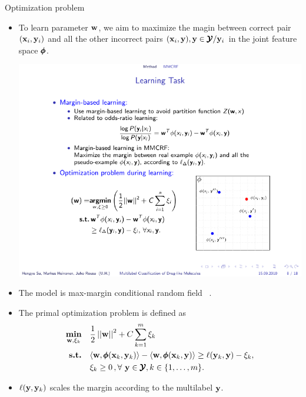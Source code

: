 \documentclass[first=dgreen,second=purple,logo=yellowexc]{aaltoslides}
\begin{document}
%
\begin{frame}{Optimization problem}
	\begin{itemize}\footnotesize
		\item To learn parameter $\mathbf {w}$, we aim to maximize the magin between correct pair $(\mathbf {x}_i,\mathbf {y}_i)$ and all the other incorrect pairs $(\mathbf {x}_i,\mathbf {y}),\mathbf {y}\in\pmb {\mathcal{Y}}/\mathbf {y}_i$ in the joint feature space $\pmb \phi$.
		\begin{center}
			\includegraphics[scale = 0.6]{./figures/jointfeaturespace.pdf}
		\end{center}
		\item The model is max-margin conditional random field \mmcrf\ \cite{Rousu07, su10structured}.
		\item The primal optimization problem is defined as
		\begin{align}
			\underset{\mathbf {w},\xi_k}{\textbf{min}} & \quad \frac{1}{2}\left|\left| \mathbf {w} \right|\right|^2 + C\sum_{k=1}^{m}\xi_k \label{primalmmcrf}\\
			\textbf{s.t.} & \quad \langle \mathbf {w}, \pmb \phi(\mathbf {x}_k,\mathbf {y}_k) \rangle - \langle \mathbf {w}, \pmb \phi(\mathbf {x}_k,\mathbf {y}) \rangle  \geq \ell(\mathbf {y}_k,\mathbf {y}) -  \xi_k, \nonumber\\
			& \quad \xi_k\ge0\, , \forall\ \mathbf {y}\in\pmb {\mathcal{Y}}, k \in \{ 1,\dots,m \}.\nonumber
		\end{align}
		\item $\ell(\mathbf {y},\mathbf {y}_k)$ scales the margin according to the multilabel $\mathbf {y}$.
	\end{itemize}
\end{frame}
\end{document}
